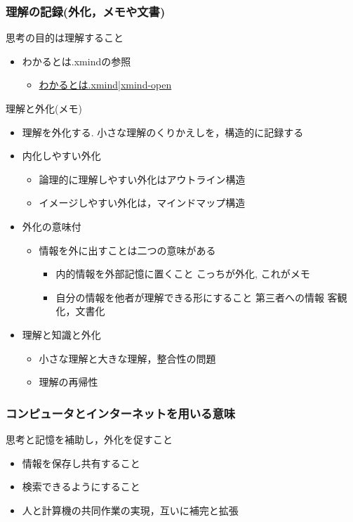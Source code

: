 \documentclass[dvipdfmx,11pat]{jarticle}
\begin{document}
\subsubsection{理解の記録(外化，メモや文書)}
\label{sec:org9295191}
思考の目的は理解すること
\begin{itemize}
\item わかるとは.xmindの参照
\begin{itemize}
\item \href{../Maps/わかるとは.xmind}{わかるとは.xmind}|\href{shell:xmind  ../Maps/わかるとは.xmind}{xmind-open}
\end{itemize}
\end{itemize}

理解と外化(メモ)  
\begin{itemize}
\item 理解を外化する. 小さな理解のくりかえしを，構造的に記録する
\item 内化しやすい外化
\begin{itemize}
\item 論理的に理解しやすい外化はアウトライン構造
\item イメージしやすい外化は，マインドマップ構造
\end{itemize}
\item 外化の意味付
\begin{itemize}
\item 情報を外に出すことは二つの意味がある
\begin{itemize}
\item 内的情報を外部記憶に置くこと
こっちが外化, これがメモ
\item 自分の情報を他者が理解できる形にすること
第三者への情報 客観化，文書化
\end{itemize}
\end{itemize}
\item 理解と知識と外化
\begin{itemize}
\item 小さな理解と大きな理解，整合性の問題
\item 理解の再帰性
\end{itemize}
\end{itemize}
\subsubsection{コンピュータとインターネットを用いる意味}
\label{sec:org14bc6cf}
思考と記憶を補助し，外化を促すこと
\begin{itemize}
\item 情報を保存し共有すること
\item 検索できるようにすること
\item 人と計算機の共同作業の実現，互いに補完と拡張
\end{itemize}
\end{document}
